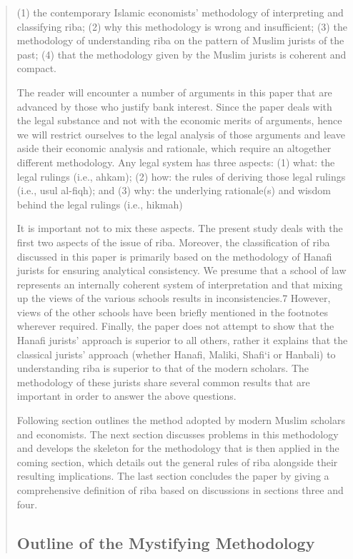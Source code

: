 \begin{quote}
(1) the contemporary Islamic economists' methodology of interpreting and classifying riba; (2) why this methodology is wrong and insufficient; (3) the methodology of understanding riba on the pattern of Muslim jurists of the past; (4) that the methodology given by the Muslim jurists is coherent and compact.

The reader will encounter a number of arguments in this paper that are advanced by those who justify bank interest. Since the paper deals with the legal substance and not with the economic merits of arguments, hence we will restrict ourselves to the legal analysis of those arguments and leave aside their economic analysis and rationale, which require an altogether different methodology. Any legal system has three aspects: (1) what: the legal rulings (i.e., ahkam); (2) how: the rules of deriving those legal rulings (i.e., usul al-fiqh); and (3) why: the underlying rationale(s) and wisdom behind the legal rulings (i.e., hikmah)

It is important not to mix these aspects. The present study deals with the first two aspects of the issue of riba. Moreover, the classification of riba discussed in this paper is primarily based on the methodology of Hanafi jurists for ensuring analytical consistency. We presume that a school of law represents an internally coherent system of interpretation and that mixing up the views of the various schools results in inconsistencies.7 However, views of the other schools have been briefly mentioned in the footnotes wherever required. Finally, the paper does not attempt to show that the Hanafi jurists' approach is superior to all others, rather it explains that the classical jurists' approach (whether Hanafi, Maliki, Shafi‘i or Hanbali) to understanding riba is superior to that of the modern scholars. The methodology of these jurists share several common results that are important in order to answer the above questions.

Following section outlines the method adopted by modern Muslim scholars and economists. The next section discusses problems in this methodology and develops the skeleton for the methodology that is then applied in the coming section, which details out the general rules of riba alongside their resulting implications. The last section concludes the paper by giving a comprehensive definition of riba based on discussions in sections three and four.


\newpage
\subsection{Outline of the Mystifying Methodology}


\end{quote}
